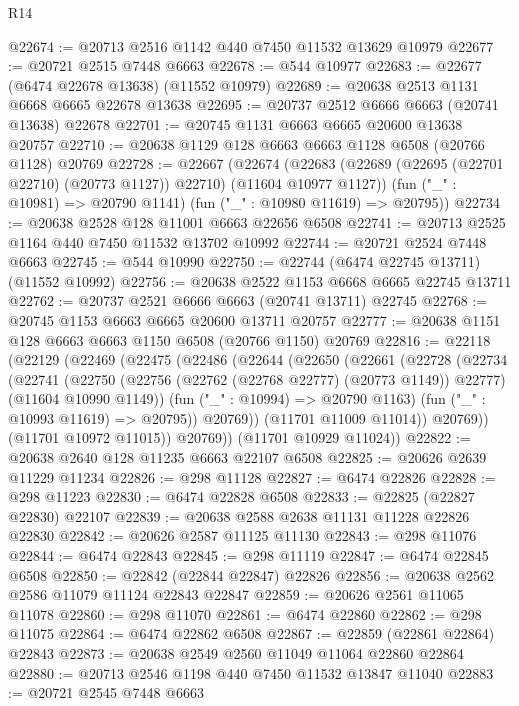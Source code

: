 \begin{lexlean}{R14}
\begin{coremodule}
@22674 := @20713 @2516 @1142 @440 @7450 @11532 @13629 @10979
@22677 := @20721 @2515 @7448 @6663
@22678 := @544 @10977
@22683 := @22677 (@6474 @22678 @13638) (@11552 @10979)
@22689 := @20638 @2513 @1131 @6668 @6665 @22678 @13638
@22695 := @20737 @2512 @6666 @6663 (@20741 @13638) @22678
@22701 := @20745 @1131 @6663 @6665 @20600 @13638 @20757
@22710 := @20638 @1129 @128 @6663 @6663 @1128 @6508 (@20766 @1128) @20769
@22728 := @22667
    (@22674
      (@22683 (@22689 (@22695 (@22701 @22710) (@20773 @1127)) @22710) (@11604 @10977 @1127))
      (fun ("_" : @10981) => @20790 @1141)
      (fun ("_" : @10980 @11619) => @20795))
@22734 := @20638 @2528 @128 @11001 @6663 @22656 @6508
@22741 := @20713 @2525 @1164 @440 @7450 @11532 @13702 @10992
@22744 := @20721 @2524 @7448 @6663
@22745 := @544 @10990
@22750 := @22744 (@6474 @22745 @13711) (@11552 @10992)
@22756 := @20638 @2522 @1153 @6668 @6665 @22745 @13711
@22762 := @20737 @2521 @6666 @6663 (@20741 @13711) @22745
@22768 := @20745 @1153 @6663 @6665 @20600 @13711 @20757
@22777 := @20638 @1151 @128 @6663 @6663 @1150 @6508 (@20766 @1150) @20769
@22816 := @22118
    (@22129
      (@22469
        (@22475
          (@22486
            (@22644
              (@22650
                (@22661
                  (@22728
                    (@22734
                      (@22741
                        (@22750
                          (@22756 (@22762 (@22768 @22777) (@20773 @1149)) @22777)
                          (@11604 @10990 @1149))
                        (fun ("_" : @10994) => @20790 @1163)
                        (fun ("_" : @10993 @11619) => @20795))
                      @20769))
                  (@11701 @11009 @11014))
                @20769))
            (@11701 @10972 @11015))
          @20769))
      (@11701 @10929 @11024))
@22822 := @20638 @2640 @128 @11235 @6663 @22107 @6508
@22825 := @20626 @2639 @11229 @11234
@22826 := @298 @11128
@22827 := @6474 @22826
@22828 := @298 @11223
@22830 := @6474 @22828 @6508
@22833 := @22825 (@22827 @22830) @22107
@22839 := @20638 @2588 @2638 @11131 @11228 @22826 @22830
@22842 := @20626 @2587 @11125 @11130
@22843 := @298 @11076
@22844 := @6474 @22843
@22845 := @298 @11119
@22847 := @6474 @22845 @6508
@22850 := @22842 (@22844 @22847) @22826
@22856 := @20638 @2562 @2586 @11079 @11124 @22843 @22847
@22859 := @20626 @2561 @11065 @11078
@22860 := @298 @11070
@22861 := @6474 @22860
@22862 := @298 @11075
@22864 := @6474 @22862 @6508
@22867 := @22859 (@22861 @22864) @22843
@22873 := @20638 @2549 @2560 @11049 @11064 @22860 @22864
@22880 := @20713 @2546 @1198 @440 @7450 @11532 @13847 @11040
@22883 := @20721 @2545 @7448 @6663

\end{coremodule}
\end{lexlean}
